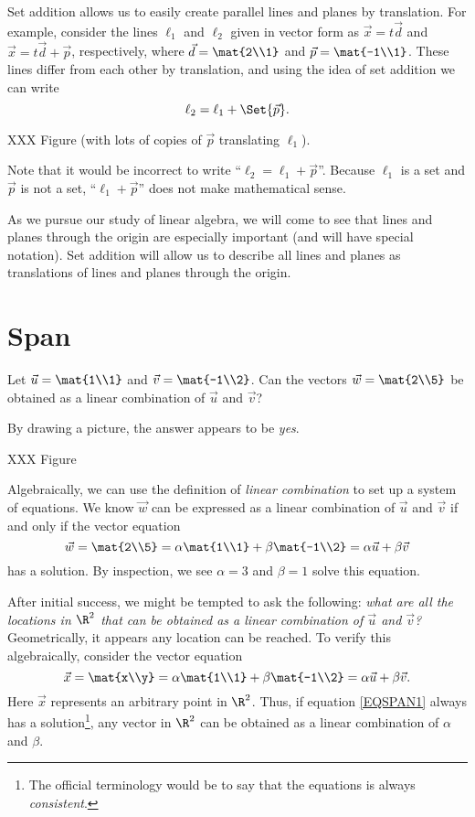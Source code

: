 Set addition allows us to easily create parallel lines and planes by translation. For example,
consider the lines $\ell_1$ and $\ell_2$ given in vector form as $\vec x=t\vec d$ and $\vec x=t\vec d+\vec p$,
respectively, where  $\vec d=\mat{2\\1}$ and $\vec p=\mat{-1\\1}$.  These lines
differ from each other by translation, and using the idea of set addition we can write
\[
	\ell_2 = \ell_1+\Set{\vec p}.
\]

XXX Figure (with lots of copies of $\vec p$ translating $\ell_1$).

Note that it would be incorrect to write ``$\ell_2=\ell_1+\vec p$''. Because $\ell_1$
is a set and $\vec p$ is not a set, ``$\ell_1+\vec p$'' does not make mathematical sense.

As we pursue our study of linear algebra, we will come to see that lines and planes through
the origin are especially important (and will have special notation). 
Set addition will allow us to describe all lines and planes as translations of lines
and planes through the origin.


\section{Span}

Let $\vec u=\mat{1\\1}$ and $\vec v=\mat{-1\\2}$. Can the vectors $\vec w=\mat{2\\5}$ be obtained
as a linear combination of $\vec u$ and $\vec v$?

By drawing a picture, the answer appears to be \emph{yes}.

XXX Figure

Algebraically, we can use the definition of \emph{linear combination} to set up a system of equations.
We know $\vec w$ can be expressed as a linear combination of $\vec u$ and $\vec v$ if and only if 
the vector equation
\[
	\vec w = \mat{2\\5}=\alpha\mat{1\\1}+\beta\mat{-1\\2}=\alpha \vec u+\beta \vec v
\]
has a solution. By inspection, we see $\alpha=3$ and $\beta=1$ solve this equation.

After initial success, we might be tempted to ask the following:
\emph{what are all the locations in $\R^2$ that can be obtained
as a linear combination of $\vec u$ and $\vec v$?} Geometrically, it appears
any location can be reached. To verify this algebraically, consider the vector equation
\begin{equation}
	\label{EQSPAN1}
	\vec x=\mat{x\\y} = \alpha\mat{1\\1}+\beta\mat{-1\\2} = \alpha\vec u+\beta\vec v.
\end{equation}
Here $\vec x$ represents an arbitrary point in $\R^2$. Thus, if equation \eqref{EQSPAN1} always
has a solution\footnote{ The official terminology would be to say that
the equations is always \emph{consistent}.}, any vector in $\R^2$ can be obtained as a linear combination of $\alpha$ and $\beta$.

